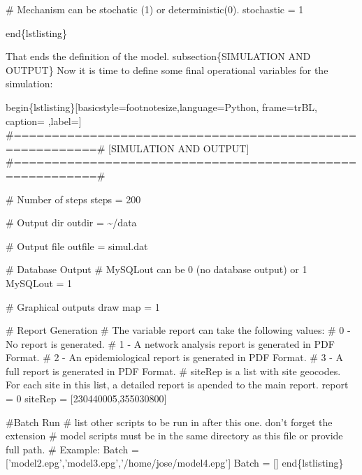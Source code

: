 \documentclass[a4paper,10pt]{manual}
\begin{document}
\# Mechanism can be stochatic (1) or deterministic(0).
stochastic = 1

end\{lstlisting\}

That ends the definition of the model.
subsection\{SIMULATION AND OUTPUT\}
Now it is time to define some final operational variables for the simulation:

begin\{lstlisting\}{[}basicstyle=footnotesize,language=Python, frame=trBL, caption= ,label={]}
\#=========================================================\#
{[}SIMULATION AND OUTPUT{]}
\#=========================================================\#

\# Number of steps
steps = 200

\# Output dir
outdir = \textasciitilde{}/data

\# Output file
outfile = simul.dat

\# Database Output
\# MySQLout can be 0 (no database output) or 1
MySQLout = 1

\# Graphical outputs
draw map = 1

\# Report Generation
\# The variable report can take the following values:
\# 0 - No report is generated.
\# 1 - A network analysis report is generated in PDF Format.
\# 2 - An epidemiological report is generated in PDF Format.
\# 3 - A full report is generated in PDF Format.
\# siteRep is a list with site geocodes. For each site in this list, a detailed report is apended to the main report.
report = 0
siteRep = {[}230440005,355030800{]}

\#Batch Run
\#  list other scripts to be run in after this one. don't forget the extension   
\#  model scripts must be in the same directory as this file or provide full path.
\#  Example: Batch = {[}'model2.epg','model3.epg','/home/jose/model4.epg'{]}
Batch = {[}{]}
end\{lstlisting\}
\end{document}

